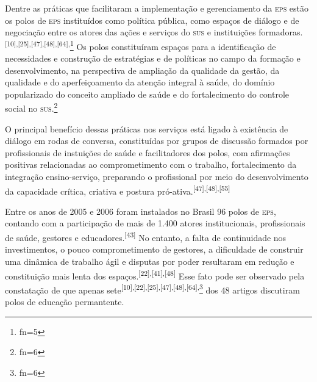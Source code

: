 \documentclass{article}
\makeatletter
\newcommand{\fn}{\afterassignment\fn@aux\count0=}
\newcommand{\fn@aux}{\csname fn\the\count0\endcsname}
\makeatother
\begin{document}
Dentre as práticas que facilitaram a implementação e gerenciamento da \textsc{eps} estão
os polos de \textsc{eps} instituídos como política pública, como espaços de diálogo e de
negociação entre os atores das ações e serviços do \textsc{sus} e instituições
formadoras.\textsuperscript{[}\textsuperscript{10}\textsuperscript{]}\textsuperscript{,}\textsuperscript{[}\textsuperscript{25}\textsuperscript{]}\textsuperscript{,}\textsuperscript{[}\textsuperscript{47}\textsuperscript{]}\textsuperscript{,}\textsuperscript{[}\textsuperscript{48}\textsuperscript{]}\textsuperscript{,}\textsuperscript{[}\textsuperscript{64}\textsuperscript{]}\textsuperscript{,}\footnote{\fn5}
Os polos constituíram espaços para a identificação de necessidades e construção
de estratégias e de políticas no campo da formação e desenvolvimento, na
perspectiva de ampliação da qualidade da gestão, da qualidade e do
aperfeiçoamento da atenção integral à saúde, do domínio popularizado do conceito
ampliado de saúde e do fortalecimento do controle social no \textsc{sus}.\footnote{\fn6}

O principal benefício dessas práticas nos serviços está ligado à existência de
diálogo em rodas de conversa, constituídas por grupos de discussão formados por
profissionais de instuições de saúde e facilitadores dos polos, com afirmações
positivas relacionadas ao comprometimento com o trabalho, fortalecimento da
integração ensino-serviço, preparando o profissional por meio do desenvolvimento
da capacidade crítica, criativa e postura pró-ativa.\textsuperscript{[}\textsuperscript{47}\textsuperscript{]}\textsuperscript{,}\textsuperscript{[}\textsuperscript{48}\textsuperscript{]}\textsuperscript{,}\textsuperscript{[}\textsuperscript{55}\textsuperscript{]}

Entre os anos de 2005 e 2006 foram instalados no Brasil 96 polos de \textsc{eps},
contando com a participação de mais de 1.400 atores institucionais,
profissionais de saúde, gestores e educadores.\textsuperscript{[}\textsuperscript{43}\textsuperscript{]}
No entanto, a falta de continuidade nos investimentos, o pouco comprometimento
de gestores, a dificuldade de construir uma dinâmica de trabalho ágil e disputas
por poder resultaram em redução e constituição mais lenta dos espaços.\textsuperscript{[}\textsuperscript{22}\textsuperscript{]}\textsuperscript{,}\textsuperscript{[}\textsuperscript{41}\textsuperscript{]}\textsuperscript{,}\textsuperscript{[}\textsuperscript{48}\textsuperscript{]}
Esse fato pode ser observado pela constatação de que apenas sete\textsuperscript{[}\textsuperscript{10}\textsuperscript{]}\textsuperscript{,}\textsuperscript{[}\textsuperscript{22}\textsuperscript{]}\textsuperscript{,}\textsuperscript{[}\textsuperscript{25}\textsuperscript{]}\textsuperscript{,}\textsuperscript{[}\textsuperscript{47}\textsuperscript{]}\textsuperscript{,}\textsuperscript{[}\textsuperscript{48}\textsuperscript{]}\textsuperscript{,}\textsuperscript{[}\textsuperscript{64}\textsuperscript{]}\textsuperscript{,}\footnote{\fn6}
dos 48 artigos discutiram polos de educação permantente.
\end{document}
